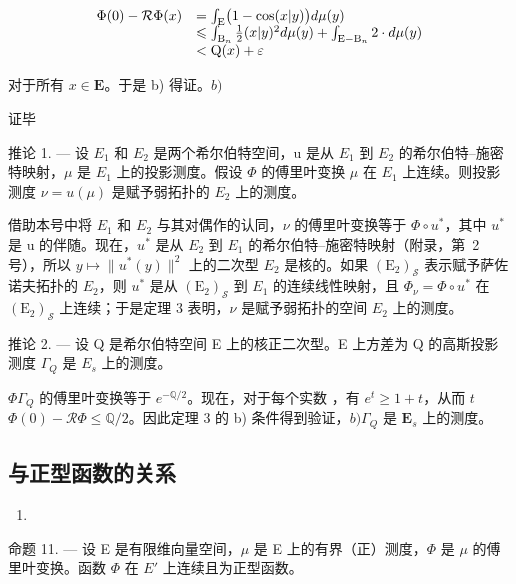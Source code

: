 \[
\begin{array}{r l} \Phi (0) - \mathcal {R} \Phi (x) & = \int_ {\mathrm{E}} \bigl (1 - \cos (x | y) \bigr) d \mu (y) \\ & \leqslant \int_ {\mathrm{B} _ {n}} \frac {1}{2} (x | y) ^ {2} d \mu (y) + \int_ {\mathrm{E} - \mathrm{B} _ {n}} 2 \cdot d \mu (y) \\ & <   \mathrm{Q} (x) + \varepsilon \end{array}
\]

对于所有 \(x \in \mathbf{E}\)。于是 b) 得证。\(b)\)

证毕

推论 1. --- 设 \(E_{1}\) 和 \(E_{2}\) 是两个希尔伯特空间，u 是从 \(E_{1}\) 到 \(E_{2}\) 的希尔伯特--施密特映射，\(\mu\) 是 \(E_{1}\) 上的投影测度。假设 \(\Phi\) 的傅里叶变换 \(\mu\) 在 \(E_{1}\) 上连续。则投影测度 \(\nu = u(\mu)\) 是赋予弱拓扑的 \(E_{2}\) 上的测度。

借助本号中将 \(E_{1}\) 和 \(E_{2}\) 与其对偶作的认同，\(\nu\) 的傅里叶变换等于 \(\Phi\circ u^{*}\)，其中 \(u^{*}\) 是 u 的伴随。现在，\(u^{*}\) 是从 \(E_{2}\) 到 \(E_{1}\) 的希尔伯特--施密特映射（附录，第~2号），所以 \(y\mapsto\|u^{*}(y)\|^{2}\) 上的二次型 \(E_{2}\) 是核的。如果 \((\mathrm{E}_{2})_{\mathcal{S}}\) 表示赋予萨佐诺夫拓扑的 \(E_{2}\)，则 \(u^{*}\) 是从 \((\mathrm{E}_{2})_{\mathcal{S}}\) 到 \(E_{1}\) 的连续线性映射，且 \(\Phi_{\nu}=\Phi\circ u^{*}\) 在 \((\mathrm{E}_{2})_{\mathcal{S}}\) 上连续；于是定理 3 表明，\(\nu\) 是赋予弱拓扑的空间 \(E_{2}\) 上的测度。

推论 2. --- 设 Q 是希尔伯特空间 E 上的核正二次型。E 上方差为 Q 的高斯投影测度 \(\Gamma_{Q}\) 是 \(E_{s}\) 上的测度。

 \(\Phi\)\(\Gamma_{Q}\) 的傅里叶变换等于 \(e^{-\mathbb{Q} / 2}\)。现在，对于每个实数 ，有 \(e^t \geqslant 1 + t\)，从而 \(t\)\(\Phi(0) - \mathcal{R}\Phi \leqslant \mathbb{Q} / 2\)。因此定理 3 的 b) 条件得到验证，\(b)\)\(\Gamma_{Q}\) 是 \(\mathbf{E}_s\) 上的测度。

\subsection{与正型函数的关系}

\begin{enumerate}
\def\labelenumi{(\arabic{enumi})}
\setcounter{enumi}{65}
\tightlist
\item
\end{enumerate}

命题 11. --- 设 E 是有限维向量空间，\(\mu\) 是 E 上的有界（正）测度，\(\Phi\) 是 \(\mu\) 的傅里叶变换。函数 \(\Phi\) 在 \(E'\) 上连续且为正型函数。

